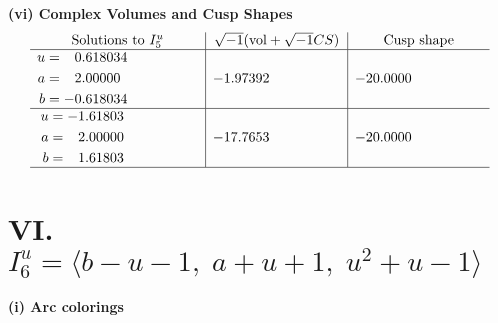\documentclass[1p]{elsarticle_modified}
\theoremstyle{definition}
\newcommand{\I}{\sqrt{-1}}
\begin{document}
\newpage\flushleft \textbf{(vi) Complex Volumes and Cusp Shapes}
$$\begin{array}{c|c|c}  
\text{Solutions to }I^u_{5}& \I (\text{vol} + \sqrt{-1}CS) & \text{Cusp shape}\\
 \hline 
\begin{aligned}
u &= \phantom{-}0.618034\phantom{ +0.000000I} \\
a &= \phantom{-}2.00000\phantom{ +0.000000I} \\
b &= -0.618034\phantom{ +0.000000I}\end{aligned}
 & -1.97392\phantom{ +0.000000I} & -20.0000\phantom{ +0.000000I} \\ \hline\begin{aligned}
u &= -1.61803\phantom{ +0.000000I} \\
a &= \phantom{-}2.00000\phantom{ +0.000000I} \\
b &= \phantom{-}1.61803\phantom{ +0.000000I}\end{aligned}
 & -17.7653\phantom{ +0.000000I} & -20.0000\phantom{ +0.000000I}\\
 \hline 
 \end{array}$$\newpage\newpage\renewcommand{\arraystretch}{1}
\centering \section*{VI. $I^u_{6}= \langle b- u-1,\;a+u+1,\;u^2+u-1 \rangle$}
\flushleft \textbf{(i) Arc colorings}\\
\end{document}
